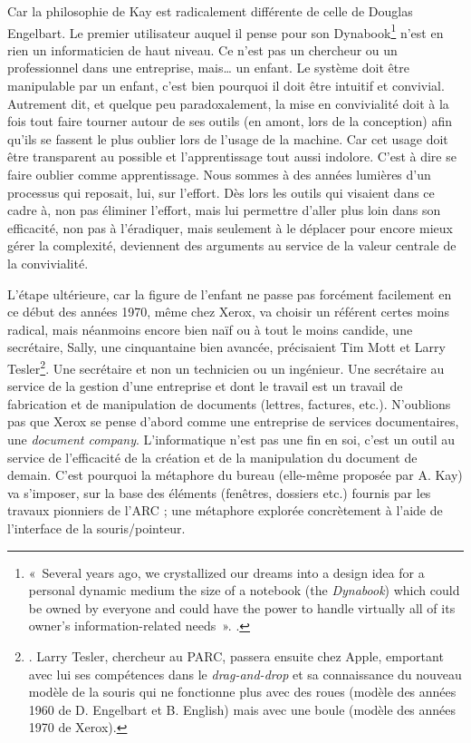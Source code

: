 \documentclass{FramateX}
\begin{document}
\begin{refsection}
Car la philosophie de Kay est radicalement différente de celle de
Douglas Engelbart. Le premier utilisateur auquel il pense pour son
Dynabook\footnote{«~Several years ago, we crystallized our dreams into
a design idea for a personal dynamic medium the size of a notebook (the
\textit{Dynabook}) which could be owned by everyone and could have the
power to handle virtually all of its owner's information-related
needs~». \cite{kaypersonal2003}.} n'est en rien un
informaticien de haut niveau. Ce n'est pas un chercheur ou un
professionnel dans une entreprise, mais… un enfant. Le système doit être
manipulable par un enfant, c'est bien pourquoi il doit être intuitif et
convivial. Autrement dit, et quelque peu paradoxalement, la mise en
convivialité doit à la fois tout faire tourner autour de ses outils (en
amont, lors de la conception) afin qu'ils se fassent le plus oublier
lors de l'usage de la machine. Car cet usage doit être transparent au
possible et l'apprentissage tout aussi indolore. C'est à dire se faire
oublier comme apprentissage. Nous sommes à des années lumières d'un
processus qui reposait, lui, sur l'effort. Dès lors les outils qui
visaient dans ce cadre à, non pas éliminer l'effort, mais lui permettre
d'aller plus loin dans son efficacité, non pas à l'éradiquer, mais
seulement à le déplacer pour encore mieux gérer la complexité,
deviennent des arguments au service de la valeur centrale de la
convivialité. 

L'étape ultérieure, car la figure de l'enfant ne passe pas forcément
facilement en ce début des années 1970, même chez Xerox, va choisir un
référent certes moins radical, mais néanmoins encore bien naïf ou à
tout le moins candide, une secrétaire, Sally, une cinquantaine bien
avancée, précisaient Tim Mott et Larry Tesler\footnote{\cite[p.~162]{bardinibootstrapping2001}. Larry Tesler,
chercheur au PARC, passera ensuite chez Apple, emportant avec lui ses
compétences dans le \textit{drag-and-drop} et sa connaissance du nouveau
modèle de la souris qui ne fonctionne plus avec des roues (modèle des
années 1960 de D. Engelbart et B. English) mais avec une boule (modèle
des années 1970 de Xerox).}. Une secrétaire et non un
technicien ou un ingénieur. Une secrétaire au service de la gestion
d'une entreprise et dont le travail est un travail de fabrication et de
manipulation de documents (lettres, factures, etc.). N'oublions pas que
Xerox se pense d'abord comme une entreprise de services documentaires,
une \textit{document company}. L'informatique n'est pas une fin en soi,
c'est un outil au service de l'efficacité de la création et de la
manipulation du document de demain. C'est pourquoi la
métaphore du bureau (elle-même proposée par A. Kay) va s'imposer,
sur la base des éléments (fenêtres, dossiers etc.) fournis par les
travaux pionniers de l'ARC ; une métaphore explorée concrètement à
l'aide de l'interface de la souris/pointeur.


\end{refsection}
\end{document}
